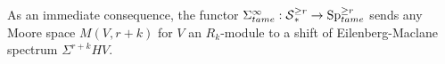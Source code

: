 \begin{remark}
 As an immediate consequence, the functor $\Sigma^{\infty}_{tame}:\operatorname{\mathcal{S}}^{\geq r}_* \to \operatorname{Sp}^{\geq r}_{tame}$ sends any Moore space $M(V,r+k)$ for $V$ an $R_k$-module to a shift of  Eilenberg-Maclane spectrum $\Sigma^{r+k}HV$.
\end{remark}
%
%

